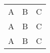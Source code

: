 \documentclass[10pt]{book}
\begin{document}
  \begin{tabular}{ccc}
  A & B & C \\
  \cmidrule{2-3}
  A & B & C \\
  \cline{1-2}
  A & B & C \\
  \end{tabular}
\end{document}
